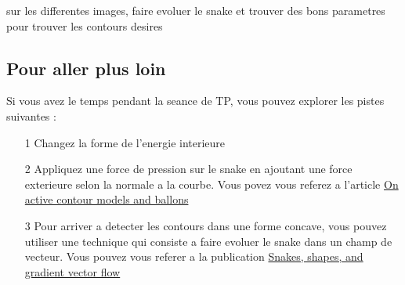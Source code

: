 \documentclass[10pt,a4paper]{article}
\begin{document}
sur les differentes images, faire evoluer le snake et trouver des bons parametres pour trouver les contours desires

\subsection{Pour aller plus loin}
Si vous avez le temps pendant la seance de TP, vous pouvez explorer les pistes suivantes : 
\begin{itemize}
	\item[1] Changez la forme de l'energie interieure
	\item[2] Appliquez une force de pression sur le snake en ajoutant une force exterieure selon la normale a la courbe. Vous povez vous referez a l'article \href{http://ac.els-cdn.com/104996609190028N/1-s2.0-104996609190028N-main.pdf?_tid=8cc41376-c1ff-11e4-a8e9-00000aab0f26&acdnat=1425426585_a1dae6c4928c4fa3bc99d9bffe5d920c}{On active contour models and ballons}
	\item[3] Pour arriver a detecter les contours dans une forme concave, vous pouvez utiliser une technique qui consiste a faire evoluer le snake dans un champ de vecteur. Vous pouvez vous referer a la publication \href{http://www-artemis.it-sudparis.eu/~rougon/IMA4509/Controle/Sujets/Xu-IP-1998.pdf}{Snakes, shapes, and gradient vector flow}
\end{itemize}
\end{document}
